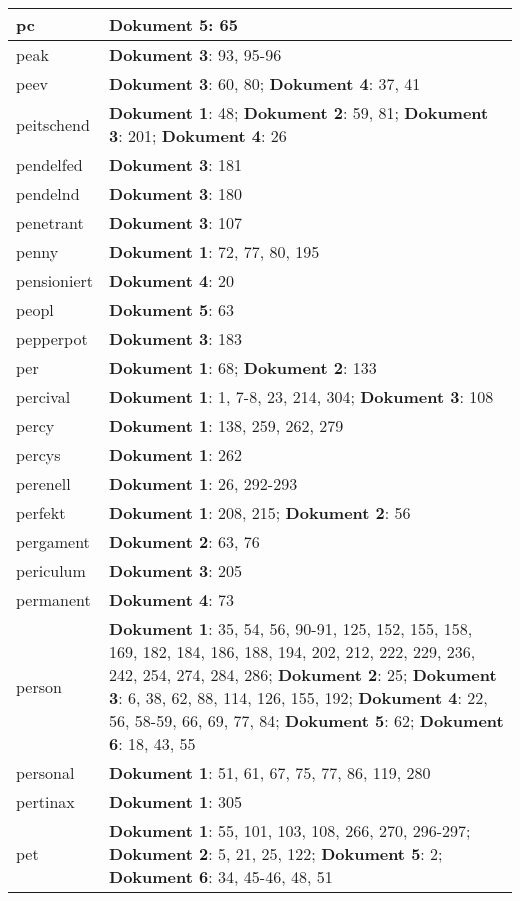 \documentclass[a5paper]{article}
\begin{document}
\begin{longtable}[l]{|l|p{3in}|}
\hline
pc & \textbf{Dokument 5}: 65 \\
\hline
peak & \textbf{Dokument 3}: 93, 95-96 \\
\hline
peev & \textbf{Dokument 3}: 60, 80; \textbf{Dokument 4}: 37, 41 \\
\hline
peitschend & \textbf{Dokument 1}: 48; \textbf{Dokument 2}: 59, 81; \textbf{Dokument 3}: 201; \textbf{Dokument 4}: 26 \\
\hline
pendelfed & \textbf{Dokument 3}: 181 \\
\hline
pendelnd & \textbf{Dokument 3}: 180 \\
\hline
penetrant & \textbf{Dokument 3}: 107 \\
\hline
penny & \textbf{Dokument 1}: 72, 77, 80, 195 \\
\hline
pensioniert & \textbf{Dokument 4}: 20 \\
\hline
peopl & \textbf{Dokument 5}: 63 \\
\hline
pepperpot & \textbf{Dokument 3}: 183 \\
\hline
per & \textbf{Dokument 1}: 68; \textbf{Dokument 2}: 133 \\
\hline
percival & \textbf{Dokument 1}: 1, 7-8, 23, 214, 304; \textbf{Dokument 3}: 108 \\
\hline
percy & \textbf{Dokument 1}: 138, 259, 262, 279 \\
\hline
percys & \textbf{Dokument 1}: 262 \\
\hline
perenell & \textbf{Dokument 1}: 26, 292-293 \\
\hline
perfekt & \textbf{Dokument 1}: 208, 215; \textbf{Dokument 2}: 56 \\
\hline
pergament & \textbf{Dokument 2}: 63, 76 \\
\hline
periculum & \textbf{Dokument 3}: 205 \\
\hline
permanent & \textbf{Dokument 4}: 73 \\
\hline
person & \textbf{Dokument 1}: 35, 54, 56, 90-91, 125, 152, 155, 158, 169, 182, 184, 186, 188, 194, 202, 212, 222, 229, 236, 242, 254, 274, 284, 286; \textbf{Dokument 2}: 25; \textbf{Dokument 3}: 6, 38, 62, 88, 114, 126, 155, 192; \textbf{Dokument 4}: 22, 56, 58-59, 66, 69, 77, 84; \textbf{Dokument 5}: 62; \textbf{Dokument 6}: 18, 43, 55 \\
\hline
personal & \textbf{Dokument 1}: 51, 61, 67, 75, 77, 86, 119, 280 \\
\hline
pertinax & \textbf{Dokument 1}: 305 \\
\hline
pet & \textbf{Dokument 1}: 55, 101, 103, 108, 266, 270, 296-297; \textbf{Dokument 2}: 5, 21, 25, 122; \textbf{Dokument 5}: 2; \textbf{Dokument 6}: 34, 45-46, 48, 51 \\

\end{longtable}
\end{document}
